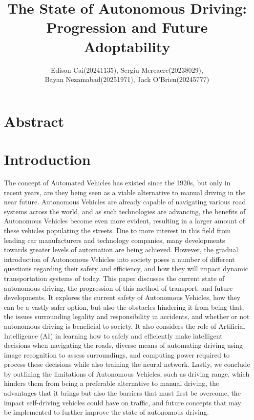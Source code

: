 \documentclass{article}
\author{Edison Cai(20241135), Sergiu Mereacre(20238029),\\
Bayan Nezamabad(20251971), Jack O'Brien(20245777)}
\title{The State of Autonomous Driving: Progression and Future Adoptability}
\begin{document}
\maketitle

\section{Abstract}

\section{Introduction}
The concept of Automated Vehicles has existed since the 1920s, but only in recent years, are they being seen as a viable alternative to manual driving in the near future. Autonomous Vehicles are already capable of navigating various road systems across the world, and as such technologies are advancing, the benefits of Autonomous Vehicles become even more evident, resulting in a larger amount of these vehicles populating the streets. Due to more interest in this field from leading car manufacturers and technology companies, many developments towards greater levels of automation are being achieved. However, the gradual introduction of Autonomous Vehicles into society poses a number of different questions regarding their safety and efficiency, and how they will impact dynamic transportation systems of today. 
\bigbreak
This paper discusses the current state of autonomous driving, the progression of this method of transport, and future developments. It explores the current safety of Autonomous Vehicles, how they can be a vastly safer option, but also the obstacles hindering it from being that, the issues surrounding legality and responsibility in accidents, and whether or not autonomous driving is beneficial to society. It also considers the role of Artificial Intelligence (AI) in learning how to safely and efficiently make intelligent decisions when navigating the roads, diverse means of automating driving using image recognition to assess surroundings, and computing power required to process these decisions while also training the neural network. Lastly, we conclude by outlining the limitations of Autonomous Vehicles, such as driving range, which hinders them from being a preferable alternative to manual driving, the advantages that it brings but also the barriers that must first be overcome, the impact self-driving vehicles could have on traffic, and future concepts that may be implemented to further improve the state of autonomous driving.
\end{document}
